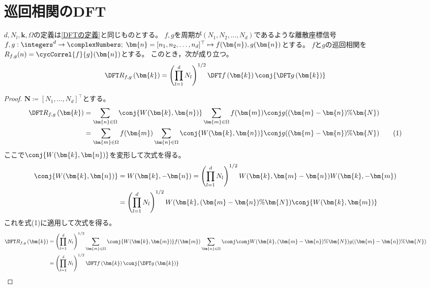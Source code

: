     \section{巡回相関のDFT}
    \label{巡回相関のDFT}
        \begin{shadebox}
            $d,N_l,\bm{k},\Omega$の定義は\ref{DFTの定義}と同じものとする。
            $f,g$を周期が$(N_1,N_2,\dots,N_d)$であるような離散座標信号$f,g: \integers^d\to\complexNumbers;\;\bm{n} = [n_1,n_2,\dots,n_d]^\top \mapsto f(\bm{n}),g(\bm{n})$とする。
            $f$と$g$の巡回相関を$R_{f,g}(n) = \cycCorrel{f}{g}(\bm{n})$とする。
            このとき，次が成り立つ。
            \[ \DFTwithArg{R_{f,g}}{\bm{k}} = \left(\prod_{l=1}^d N_l\right)^{1/2}\DFTwithArg{f}{\bm{k}}\conj{\DFTwithArg{g}{\bm{k}}} \]
        \end{shadebox}
        \begin{proof}
            \quad\par
            $\bm{N} \coloneq [N_1,\dots,N_d]^\top$とする。
            \begin{align*}
                \DFTwithArg{R_{f,g}}{\bm{k}} &= \sum_{\bm{n}\in\Omega} \conj{W(\bm{k},\bm{n})} \sum_{\bm{m}\in\Omega} f(\bm{m})\conj{g((\bm{m}-\bm{n})\%\bm{N})} \\
                &= \sum_{\bm{m}\in\Omega} f(\bm{m}) \sum_{\bm{n}\in\Omega} \conj{W(\bm{k},\bm{n})}\conj{g((\bm{m}-\bm{n})\%\bm{N})} \tag{1}
            \end{align*}
            ここで$\conj{W(\bm{k},\bm{n})}$を変形して次式を得る。
            \begin{align*}
                \conj{W(\bm{k},\bm{n})} &= W(\bm{k},-\bm{n}) = \left(\prod_{l=1}^d N_l\right)^{1/2}W(\bm{k},\bm{m}-\bm{n})W(\bm{k},-\bm{m}) \\
                &= \left(\prod_{l=1}^d N_l\right)^{1/2}W(\bm{k},(\bm{m}-\bm{n})\%\bm{N})\conj{W(\bm{k},\bm{m})}
            \end{align*}
            これを式(1)に適用して次式を得る。
            \begin{align*}
                \DFTwithArg{R_{f,g}}{\bm{k}} &= \left(\prod_{l=1}^d N_l\right)^{1/2} \sum_{\bm{m}\in\Omega} \conj{W(\bm{k},\bm{m})}f(\bm{m}) \sum_{\bm{n}\in\Omega}\conj{\conj{W(\bm{k},(\bm{m}-\bm{n})\%\bm{N})}g((\bm{m}-\bm{n})\%\bm{N})} \\
                &= \left(\prod_{l=1}^d N_l\right)^{1/2}\DFTwithArg{f}{\bm{k}}\conj{\DFTwithArg{g}{\bm{k}}}
            \end{align*}
        \end{proof}
